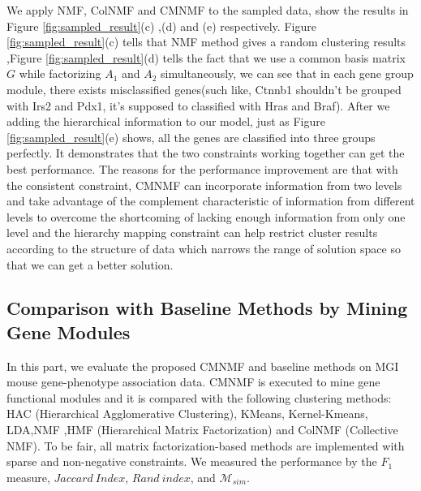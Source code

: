 \documentclass{bmcart}
\begin{document}
  We apply NMF, ColNMF and CMNMF to the sampled data, show the results in Figure \ref{fig:sampled_result}(c) ,(d) and (e) respectively. Figure \ref{fig:sampled_result}(c) tells that NMF method gives a random clustering results ,Figure \ref{fig:sampled_result}(d) tells the fact that we use a common basis matrix $G$ while factorizing $A_1$ and $A_2$ simultaneously, we can see that in each gene group module, there exists misclassified genes(such like, Ctnnb1 shouldn't be grouped with Irs2 and Pdx1, it's supposed to classified with Hras and Braf). After we adding the hierarchical information to our model, just as Figure \ref{fig:sampled_result}(e) shows, all the genes are classified into three groups perfectly. It demonstrates that the two constraints working together can get the best performance. The reasons for the performance improvement are that with the consistent constraint, CMNMF can incorporate information from two levels and take advantage of the complement characteristic of information from different levels to overcome the shortcoming of lacking enough information from only one level and the hierarchy mapping constraint can help restrict cluster results according to the structure of data which narrows the range of solution space so that we can get a better solution.

\subsection*{\textbf{Comparison with Baseline Methods by Mining Gene Modules}}
In this part, we evaluate the proposed CMNMF and baseline methods on MGI mouse gene-phenotype association data.
CMNMF is executed to mine gene functional modules and it is compared with the following clustering methods: HAC (Hierarchical Agglomerative Clustering)\cite{Ward1963}, KMeans, Kernel-Kmeans\cite{Dhillon2004}, LDA\cite{Blei2003},NMF\cite{Mika1999} ,HMF (Hierarchical Matrix Factorization) \cite{AliMashhoori2012} and ColNMF (Collective NMF)\cite{Singh2008}. To be fair, all matrix factorization-based methods are implemented with sparse and non-negative constraints. We measured the performance by the $F_1$ measure, $Jaccard\ Index$, $Rand\ index$, and $\mathcal{M}_{sim}$.
\end{document}
